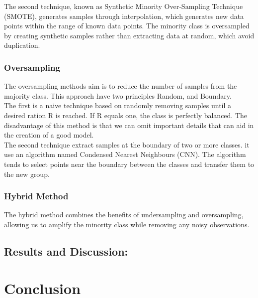 \documentclass[conference]{IEEEtran}
\begin{document}
	The second technique, known as Synthetic Minority Over-Sampling Technique (SMOTE), generates samples through interpolation, which generates new data points within the range of known data points.
	The minority class is oversampled by creating synthetic samples rather than extracting data at random, which avoid duplication.\\
	
	\subsubsection{Oversampling}
	The oversampling method\textquotesingle s aim is to reduce the number of samples from the majority class. This approach have two principles Random, and Boundary.\\
	
	The first is a naive technique based on randomly removing samples until a desired ration R is reached. If R equals one, the class is perfectly balanced. The disadvantage of this method is that we can omit important details that can aid in the creation of a good model.\\
	
	The second technique extract samples at the boundary of two or more classes. it use an algorithm named Condensed Nearest Neighbours (CNN). The algorithm tends to select points near the boundary between the classes and transfer them to the new group. 
	
	\subsubsection{Hybrid Method}	
	The hybrid method combines the benefits of undersampling and oversampling, allowing us to amplify the minority class while removing any noisy observations. 
	
	
	\subsection{Results and Discussion:}\label{AA}
	
	
	\section{Conclusion}
	
	
	
	
	
\end{document}
